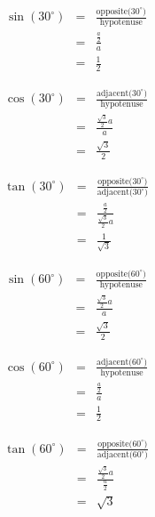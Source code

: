 \begin{minipage}{0.4\textwidth}
\begin{eqnarray*}
\sin(30^\circ)&=&\frac{\mbox{opposite($30^\circ$)}}{\mbox{hypotenuse}}\\
&=&\frac{\frac{a}{2}}{a}\\
&=&\frac{1}{2}
\end{eqnarray*}

\begin{eqnarray*}
\cos(30^\circ)&=&\frac{\mbox{adjacent($30^\circ$)}}{\mbox{hypotenuse}}\\
&=&\frac{\frac{\sqrt{3}}{2}a}{a}\\
&=&\frac{\sqrt{3}}{2}
\end{eqnarray*}

\begin{eqnarray*}
\tan(30^\circ)&=&\frac{\mbox{opposite($30^\circ$)}}{\mbox{adjacent($30^\circ$)}}\\
&=&\frac{\frac{a}{2}}{\frac{\sqrt{3}}{2}a}\\
&=&\frac{1}{\sqrt{3}}
\end{eqnarray*}

\end{minipage}
\begin{minipage}{0.4\textwidth}
\begin{eqnarray*}
\sin(60^\circ)&=&\frac{\mbox{opposite($60^\circ$)}}{\mbox{hypotenuse}}\\
&=&\frac{\frac{\sqrt{3}}{2}a}{a}\\
&=&\frac{\sqrt{3}}{2}
\end{eqnarray*}

\begin{eqnarray*}
\cos(60^\circ)&=&\frac{\mbox{adjacent($60^\circ$)}}{\mbox{hypotenuse}}\\
&=&\frac{\frac{a}{2}}{a}\\
&=&\frac{1}{2}
\end{eqnarray*}

\begin{eqnarray*}
\tan(60^\circ)&=&\frac{\mbox{opposite($60^\circ$)}}{\mbox{adjacent($60^\circ$)}}\\
&=&\frac{\frac{\sqrt{3}}{2}a}{\frac{a}{2}}\\
&=&\sqrt{3}
\end{eqnarray*}

\end{minipage}

